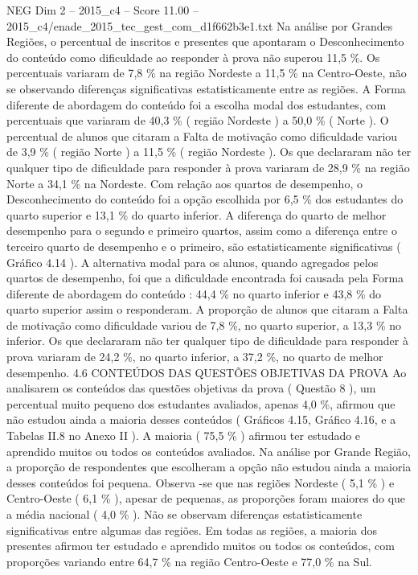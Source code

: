 \begin{textsample}{NEG Dim 2 – 2015\_c4 – Score 11.00 – 2015\_c4/enade\_2015\_tec\_gest\_com\_d1f662b3e1.txt}
Na análise por Grandes Regiões, o percentual de inscritos e presentes que apontaram o Desconhecimento do conteúdo como dificuldade ao responder à prova não superou 11,5 \%.
Os percentuais variaram de 7,8 \% na região Nordeste a 11,5 \% na Centro-Oeste, não se observando diferenças significativas estatisticamente entre as regiões.
A Forma diferente de abordagem do conteúdo foi a escolha modal dos estudantes, com percentuais que variaram de 40,3 \% ( região Nordeste ) a 50,0 \% ( Norte ).
O percentual de alunos que citaram a Falta de motivação como dificuldade variou de 3,9 \% ( região Norte ) a 11,5 \% ( região Nordeste ).
Os que declararam não ter qualquer tipo de dificuldade para responder à prova variaram de 28,9 \% na região Norte a 34,1 \% na Nordeste.
Com relação aos quartos de desempenho, o Desconhecimento do conteúdo foi a opção escolhida por 6,5 \% dos estudantes do quarto superior e 13,1 \% do quarto inferior.
A diferença do quarto de melhor desempenho para o segundo e primeiro quartos, assim como a diferença entre o terceiro quarto de desempenho e o primeiro, são estatisticamente significativas ( Gráfico 4.14 ).
A alternativa modal para os alunos, quando agregados pelos quartos de desempenho, foi que a dificuldade encontrada foi causada pela Forma diferente de abordagem do conteúdo : 44,4 \% no quarto inferior e 43,8 \% do quarto superior assim o responderam.
A proporção de alunos que citaram a Falta de motivação como dificuldade variou de 7,8 \%, no quarto superior, a 13,3 \% no inferior.
Os que declararam não ter qualquer tipo de dificuldade para responder à prova variaram de 24,2 \%, no quarto inferior, a 37,2 \%, no quarto de melhor desempenho. 4.6 CONTEÚDOS DAS QUESTÕES OBJETIVAS DA PROVA Ao analisarem os conteúdos das questões objetivas da prova ( Questão 8 ), um percentual muito pequeno dos estudantes avaliados, apenas 4,0 \%, afirmou que não estudou ainda a maioria desses conteúdos ( Gráficos 4.15, Gráfico 4.16, e a Tabelas II.8 no Anexo II ).
A maioria ( 75,5 \% ) afirmou ter estudado e aprendido muitos ou todos os conteúdos avaliados.
Na análise por Grande Região, a proporção de respondentes que escolheram a opção não estudou ainda a maioria desses conteúdos foi pequena.
Observa -se que nas regiões Nordeste ( 5,1 \% ) e Centro-Oeste ( 6,1 \% ), apesar de pequenas, as proporções foram maiores do que a média nacional ( 4,0 \% ).
Não se observam diferenças estatisticamente significativas entre algumas das regiões.
Em todas as regiões, a maioria dos presentes afirmou ter estudado e aprendido muitos ou todos os conteúdos, com proporções variando entre 64,7 \% na região Centro-Oeste e 77,0 \% na Sul.

\end{textsample}
